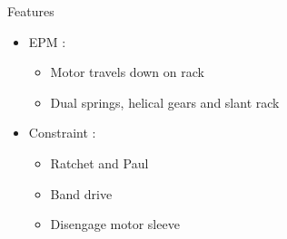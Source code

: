 \begin{frame}
\begin{columns}
\begin{block}{Features}
\begin{itemize}
\item
{\greencol EPM :}\\[0.1in]
    \begin{itemize}
    \item
    Motor travels down on rack\\[0.1in]
    \item
    Dual springs, helical gears and slant rack\\[0.1in]
    \end{itemize}
\item
{\greencol Constraint :}\\[0.1in]
    \begin{itemize}
    \item
    Ratchet and Paul\\[0.1in]
    \item
    Band drive\\[0.1in]
    \item
    Disengage motor sleeve\\[0.1in]
    \end{itemize}
\end{itemize}
\end{block}
\end{columns}
\end{frame}

